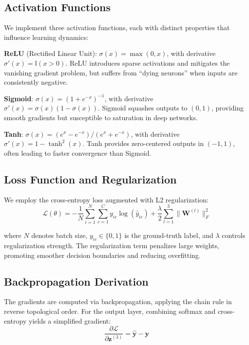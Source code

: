 \documentclass[sigconf,nonacm]{acmart}
\begin{document}
\subsection{Activation Functions}

We implement three activation functions, each with distinct properties that influence learning dynamics:

\textbf{ReLU} (Rectified Linear Unit): $\sigma(x) = \max(0, x)$, with derivative $\sigma'(x) = \mathbb{I}(x > 0)$. ReLU introduces sparse activations and mitigates the vanishing gradient problem, but suffers from ``dying neurons'' when inputs are consistently negative.

\textbf{Sigmoid}: $\sigma(x) = (1 + e^{-x})^{-1}$, with derivative $\sigma'(x) = \sigma(x)(1 - \sigma(x))$. Sigmoid squashes outputs to $(0, 1)$, providing smooth gradients but susceptible to saturation in deep networks.

\textbf{Tanh}: $\sigma(x) = (e^x - e^{-x})/(e^x + e^{-x})$, with derivative $\sigma'(x) = 1 - \tanh^2(x)$. Tanh provides zero-centered outputs in $(-1, 1)$, often leading to faster convergence than Sigmoid.

\subsection{Loss Function and Regularization}

We employ the cross-entropy loss augmented with L2 regularization:
\begin{equation}
\mathcal{L}(\theta) = -\frac{1}{N}\sum_{i=1}^{N}\sum_{c=1}^{C} y_{ic} \log(\hat{y}_{ic}) + \frac{\lambda}{2}\sum_{l=1}^{3} \|\mathbf{W}^{(l)}\|_F^2
\end{equation}

where $N$ denotes batch size, $y_{ic} \in \{0, 1\}$ is the ground-truth label, and $\lambda$ controls regularization strength. The regularization term penalizes large weights, promoting smoother decision boundaries and reducing overfitting.

\subsection{Backpropagation Derivation}

The gradients are computed via backpropagation, applying the chain rule in reverse topological order. For the output layer, combining softmax and cross-entropy yields a simplified gradient:
\begin{equation}
\frac{\partial \mathcal{L}}{\partial \mathbf{z}^{(3)}} = \hat{\mathbf{y}} - \mathbf{y}
\end{equation}
\end{document}
